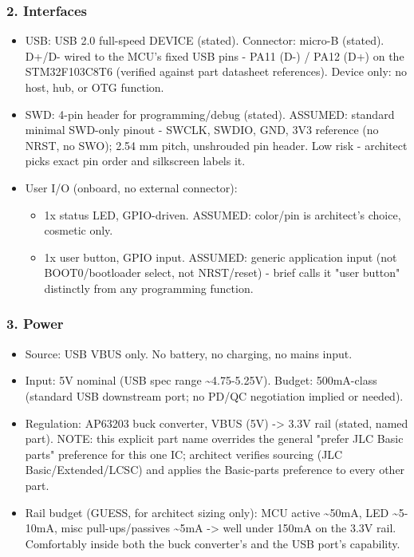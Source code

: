 \documentclass[11pt,a4paper]{article}
\begin{document}
\subsubsection*{2. Interfaces}
\begin{itemize}
\item USB: USB 2.0 full-speed DEVICE (stated). Connector: micro-B (stated).
D+/D- wired to the MCU's fixed USB pins - PA11 (D-) / PA12 (D+) on the
STM32F103C8T6 (verified against part datasheet references). Device only:
no host, hub, or OTG function.
\item SWD: 4-pin header for programming/debug (stated). ASSUMED: standard
minimal SWD-only pinout - SWCLK, SWDIO, GND, 3V3 reference (no NRST, no
SWO); 2.54 mm pitch, unshrouded pin header. Low risk - architect picks
exact pin order and silkscreen labels it.
\item User I/O (onboard, no external connector):
\begin{itemize}
\item 1x status LED, GPIO-driven. ASSUMED: color/pin is architect's choice,
cosmetic only.
\item 1x user button, GPIO input. ASSUMED: generic application input (not
BOOT0/bootloader select, not NRST/reset) - brief calls it "user
button" distinctly from any programming function.
\end{itemize}
\end{itemize}
\subsubsection*{3. Power}
\begin{itemize}
\item Source: USB VBUS only. No battery, no charging, no mains input.
\item Input: 5V nominal (USB spec range \textasciitilde{}4.75-5.25V). Budget: 500mA-class
(standard USB downstream port; no PD/QC negotiation implied or needed).
\item Regulation: AP63203 buck converter, VBUS (5V) -\textgreater{} 3.3V rail (stated,
named part). NOTE: this explicit part name overrides the general
"prefer JLC Basic parts" preference for this one IC; architect verifies
sourcing (JLC Basic/Extended/LCSC) and applies the Basic-parts
preference to every other part.
\item Rail budget (GUESS, for architect sizing only): MCU active \textasciitilde{}50mA, LED
\textasciitilde{}5-10mA, misc pull-ups/passives \textasciitilde{}5mA -\textgreater{} well under 150mA on the 3.3V
rail. Comfortably inside both the buck converter's and the USB port's
capability.
\end{itemize}
\end{document}
